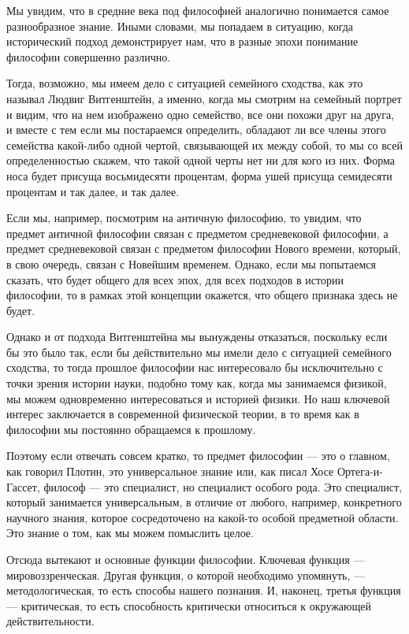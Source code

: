 \documentclass[oneside,final,14pt]{extreport}
\begin{document}
Мы увидим, что в средние века под философией аналогично понимается самое разнообразное знание. Иными словами, мы попадаем в ситуацию, когда исторический подход демонстрирует нам, что в разные эпохи понимание философии совершенно различно.

Тогда, возможно, мы имеем дело с ситуацией семейного сходства, как это называл Людвиг Витгенштейн, а именно, когда мы смотрим на семейный портрет и видим, что на нем изображено одно семейство, все они похожи друг на друга, и вместе с тем если мы постараемся определить, обладают ли все члены этого семейства какой-либо одной чертой, связывающей их между собой, то мы со всей определенностью скажем, что такой одной черты нет ни для кого из них. Форма носа будет присуща восьмидесяти процентам, форма ушей присуща семидесяти процентам и так далее, и так далее.

Если мы, например, посмотрим на античную философию, то увидим, что предмет античной философии связан с предметом средневековой философии, а предмет средневековой связан с предметом философии Нового времени, который, в свою очередь, связан с Новейшим временем. Однако, если мы попытаемся сказать, что будет общего для всех эпох, для всех подходов в истории философии, то в рамках этой концепции окажется, что общего признака здесь не будет.

Однако и от подхода Витгенштейна мы вынуждены отказаться, поскольку если бы это было так, если бы действительно мы имели дело с ситуацией семейного сходства, то тогда прошлое философии нас интересовало бы исключительно с точки зрения истории науки, подобно тому как, когда мы занимаемся физикой, мы можем одновременно интересоваться и историей физики. Но наш ключевой интерес заключается в современной физической теории, в то время как в философии мы  постоянно обращаемся к прошлому.

Поэтому если отвечать совсем кратко, то предмет философии — это о главном, как говорил Плотин, это универсальное знание или, как писал Хосе Ортега-и-Гассет, философ — это специалист, но специалист особого рода. Это специалист, который занимается универсальным, в отличие от любого, например, конкретного научного знания, которое сосредоточено на какой-то особой предметной области. Это знание о том, как мы можем помыслить целое.

Отсюда вытекают и основные функции философии. Ключевая функция — мировоззренческая. Другая функция, о которой необходимо упомянуть, — методологическая, то есть способы нашего познания. И, наконец, третья функция — критическая, то есть способность критически относиться к окружающей действительности.
\end{document}
